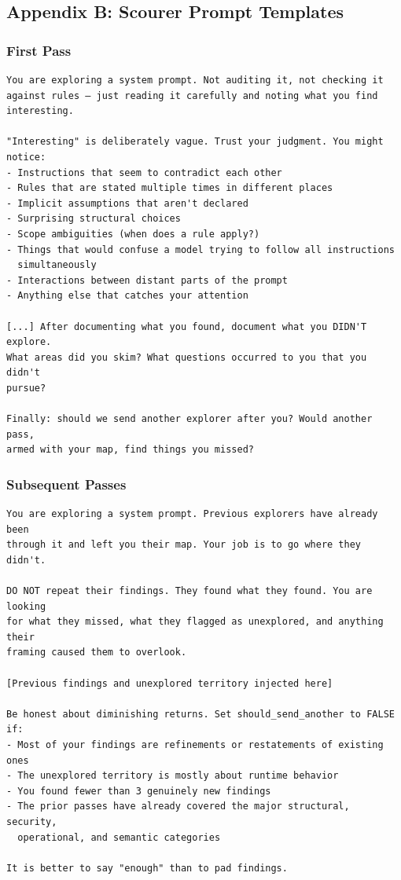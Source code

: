 \documentclass[
]{article}
\begin{document}
\hypertarget{appendix-b-scourer-prompt-templates}{%
\subsection{Appendix B: Scourer Prompt
Templates}\label{appendix-b-scourer-prompt-templates}}

\hypertarget{first-pass}{%
\subsubsection{First Pass}\label{first-pass}}

\begin{verbatim}
You are exploring a system prompt. Not auditing it, not checking it
against rules — just reading it carefully and noting what you find
interesting.

"Interesting" is deliberately vague. Trust your judgment. You might notice:
- Instructions that seem to contradict each other
- Rules that are stated multiple times in different places
- Implicit assumptions that aren't declared
- Surprising structural choices
- Scope ambiguities (when does a rule apply?)
- Things that would confuse a model trying to follow all instructions
  simultaneously
- Interactions between distant parts of the prompt
- Anything else that catches your attention

[...] After documenting what you found, document what you DIDN'T explore.
What areas did you skim? What questions occurred to you that you didn't
pursue?

Finally: should we send another explorer after you? Would another pass,
armed with your map, find things you missed?
\end{verbatim}

\hypertarget{subsequent-passes}{%
\subsubsection{Subsequent Passes}\label{subsequent-passes}}

\begin{verbatim}
You are exploring a system prompt. Previous explorers have already been
through it and left you their map. Your job is to go where they didn't.

DO NOT repeat their findings. They found what they found. You are looking
for what they missed, what they flagged as unexplored, and anything their
framing caused them to overlook.

[Previous findings and unexplored territory injected here]

Be honest about diminishing returns. Set should_send_another to FALSE if:
- Most of your findings are refinements or restatements of existing ones
- The unexplored territory is mostly about runtime behavior
- You found fewer than 3 genuinely new findings
- The prior passes have already covered the major structural, security,
  operational, and semantic categories

It is better to say "enough" than to pad findings.
\end{verbatim}
\end{document}
